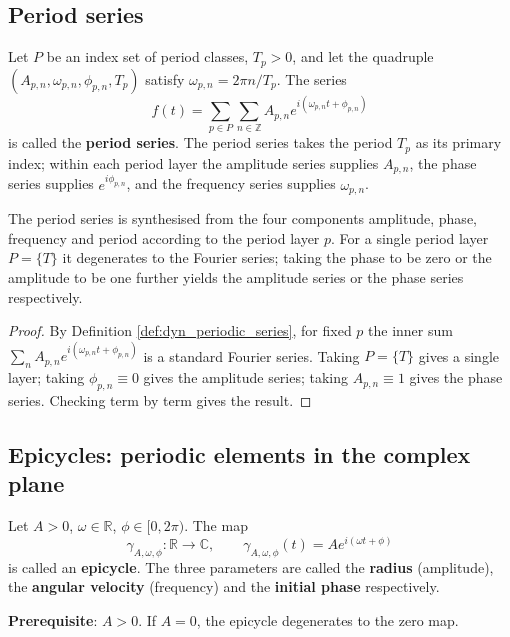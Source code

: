 \subsection{Period series}

\begin{definition}\label{def:dyn_periodic_series}
Let $P$ be an index set of period classes, $T_p>0$, and let the quadruple $(A_{p,n},\omega_{p,n},\phi_{p,n},T_p)$ satisfy $\omega_{p,n}=2\pi n/T_p$. The series
\[
f(t)=\sum_{p\in P}\sum_{n\in\mathbb Z}A_{p,n}e^{i(\omega_{p,n}t+\phi_{p,n})}
\]
is called the \textbf{period series}. The period series takes the period $T_p$ as its primary index; within each period layer the amplitude series supplies $A_{p,n}$, the phase series supplies $e^{i\phi_{p,n}}$, and the frequency series supplies $\omega_{p,n}$.
\end{definition}

\begin{proposition}\label{prop:dyn_periodic_synthesis}
The period series is synthesised from the four components amplitude, phase, frequency and period according to the period layer $p$. For a single period layer $P=\{T\}$ it degenerates to the Fourier series; taking the phase to be zero or the amplitude to be one further yields the amplitude series or the phase series respectively.
\end{proposition}

\begin{proof}
By Definition \ref{def:dyn_periodic_series}, for fixed $p$ the inner sum $\sum_n A_{p,n}e^{i(\omega_{p,n}t+\phi_{p,n})}$ is a standard Fourier series. Taking $P=\{T\}$ gives a single layer; taking $\phi_{p,n}\equiv0$ gives the amplitude series; taking $A_{p,n}\equiv1$ gives the phase series. Checking term by term gives the result.
\end{proof}

\subsection{Epicycles: periodic elements in the complex plane}

\begin{definition}[Epicycle]\label{def:dyn_epicycle}
Let $A>0$, $\omega\in\mathbb R$, $\phi\in[0,2\pi)$. The map
\[
\gamma_{A,\omega,\phi}:\mathbb R\to\mathbb C,\qquad
\gamma_{A,\omega,\phi}(t)=A e^{i(\omega t+\phi)}
\]
is called an \textbf{epicycle}. The three parameters are called the \textbf{radius} (amplitude), the \textbf{angular velocity} (frequency) and the \textbf{initial phase} respectively.

\textbf{Prerequisite}: $A>0$. If $A=0$, the epicycle degenerates to the zero map.
\end{definition}

